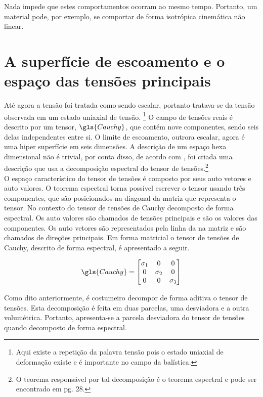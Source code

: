 Nada impede que estes comportamentos ocorram ao mesmo tempo. Portanto, um material pode, por exemplo, se comportar de forma isotrópica cinemática não linear. \\

\section{A superfície de escoamento e o espaço das tensões principais}

Até agora a tensão foi tratada como sendo escalar, portanto tratava-se da tensão observada em um estado uniaxial de tensão. \footnote{Aqui existe a repetição da palavra tensão pois o estado uniaxial de deformação existe e é importante no campo da balística.} O campo de tensões reais é descrito por um tensor, $ \gls{Cauchy} $, que contém nove componentes, sendo seis delas independentes entre si. O limite de escoamento, outrora escalar, agora é uma hiper superfície em seis dimensões. A descrição de um espaço hexa dimensional não é trivial, por conta disso, de acordo com \cite{hiermaier_2008},  foi criada uma descrição que usa a decomposição espectral do tensor de tensões.\footnote{O teorema responsável por tal decomposição é o teorema 
espectral e pode ser encontrado em \cite{gurtin_fried_anand_2013} pg. 28. } \\

O espaço característico do tensor de tensões é composto por seus auto vetores e auto valores. O teorema espectral torna possível escrever o tensor usando três componentes, que são posicionados na diagonal da matriz que representa o tensor. 
No contexto do tensor de tensões de Cauchy decomposto de forma espectral. Os auto valores são chamados de tensões principais e são os valores das componentes. Os auto vetores são representados pela linha da na matriz e são chamados de direções principais. Em forma matricial o tensor de tensões de Cauchy, descrito de forma espectral, é apresentado a seguir.

\begin{equation}
\gls{Cauchy} = 
    \begin{bmatrix}
    \sigma_1 & 0 & 0 \\
    0 & \sigma_2 & 0 \\
    0 & 0 & \sigma_3
    \end{bmatrix}
\end{equation}

Como dito anteriormente, é costumeiro decompor de forma aditiva o tensor de tensões. Esta decomposição é feita em duas parcelas, uma desviadora e a outra volumétrica. Portanto, apresenta-se a parcela desviadora do tensor de tensões quando decomposto de forma espectral.


